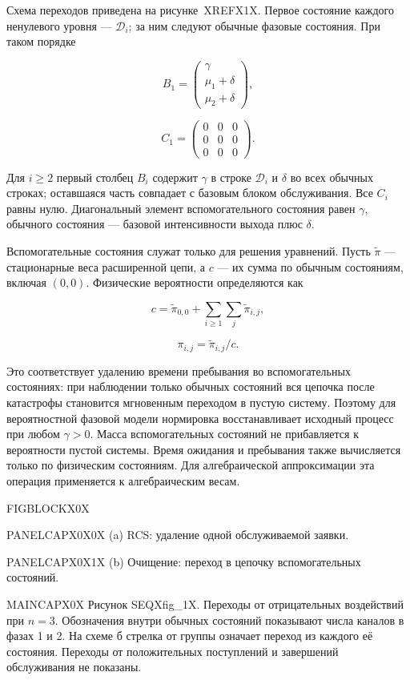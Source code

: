 Схема переходов приведена на рисунке~XREFX1X. Первое состояние каждого ненулевого уровня --- \(\mathcal{D}_i\); за ним следуют обычные фазовые состояния. При таком порядке


\[B_1=\begin{pmatrix}\gamma\\\mu_1+\delta\\\mu_2+\delta\end{pmatrix},\]

\[C_1=\begin{pmatrix}0&0&0\\0&0&0\\0&0&0\end{pmatrix}.\]


Для \(i\ge2\) первый столбец \(B_i\) содержит \(\gamma\) в строке \(\mathcal{D}_i\) и \(\delta\) во всех обычных строках; оставшаяся часть совпадает с базовым блоком обслуживания. Все \(C_i\) равны нулю. Диагональный элемент вспомогательного состояния равен \(\gamma\), обычного состояния --- базовой интенсивности выхода плюс \(\delta.\)

Вспомогательные состояния служат только для решения уравнений. Пусть \(\widetilde\pi\) --- стационарные веса расширенной цепи, а \(c\) --- их сумма по обычным состояниям, включая \((0,0).\) Физические вероятности определяются как


\[c=\widetilde\pi_{0,0}+\sum_{i\ge1}\sum_j\widetilde\pi_{i,j},\]

\[\pi_{i,j}=\widetilde\pi_{i,j}/c.\]


Это соответствует удалению времени пребывания во вспомогательных состояниях: при наблюдении только обычных состояний вся цепочка после катастрофы становится мгновенным переходом в пустую систему. Поэтому для вероятностной фазовой модели нормировка восстанавливает исходный процесс при любом \(\gamma>0.\) Масса вспомогательных состояний не прибавляется к вероятности пустой системы. Время ожидания и пребывания также вычисляется только по физическим состояниям. Для алгебраической аппроксимации эта операция применяется к алгебраическим весам.

\noindent FIGBLOCKX0X\par

\noindent PANELCAPX0X0X (a) RCS: удаление одной обслуживаемой заявки.\par

\noindent PANELCAPX0X1X (b) Очищение: переход в цепочку вспомогательных состояний.\par

\noindent MAINCAPX0X Рисунок SEQXfig_1X. Переходы от отрицательных воздействий при \(n=3.\) Обозначения внутри обычных состояний показывают числа каналов в фазах 1 и 2. На схеме б стрелка от группы означает переход из каждого её состояния. Переходы от положительных поступлений и завершений обслуживания не показаны.\par

